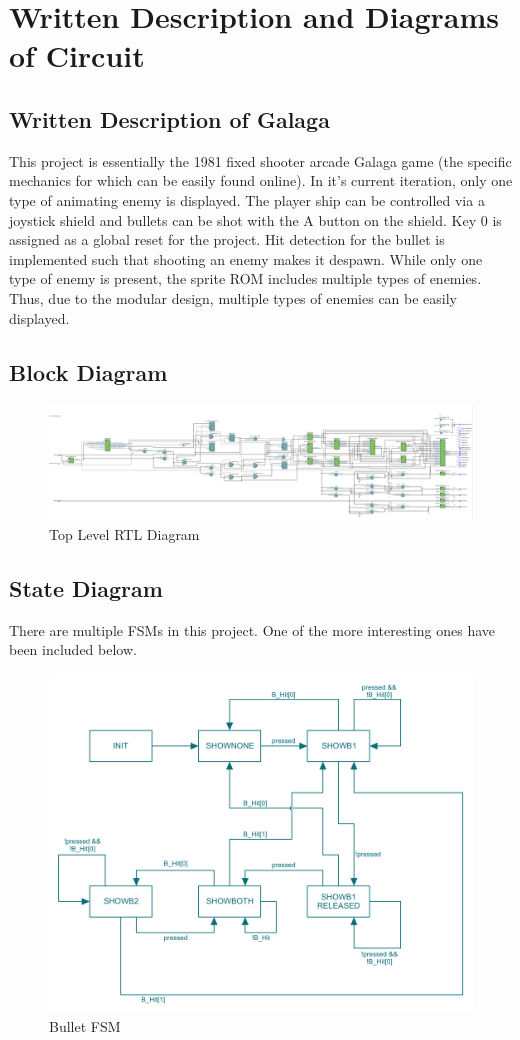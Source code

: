 \section{Written Description and Diagrams of Circuit}
\subsection{Written Description of Galaga}
\quad
This project is essentially the 1981 fixed shooter arcade Galaga game (the specific mechanics for which can be easily found online).
In it's current iteration, only one type of animating enemy is displayed.
The player ship can be controlled via a joystick shield and bullets can be shot with the A button on the shield.
Key 0 is assigned as a global reset for the project.
Hit detection for the bullet is implemented such that shooting an enemy makes it despawn.
While only one type of enemy is present, the sprite ROM includes multiple types of enemies.
Thus, due to the modular design, multiple types of enemies can be easily displayed.

\subsection{Block Diagram}
\begin{figure}[!htb]
  \centering
  \includegraphics[width=\linewidth]{rtl.png}
  \caption{Top Level RTL Diagram}
  \label{Fig: TLRTL}
\end{figure}

\pagebreak


\subsection{State Diagram}
\quad
There are multiple FSMs in this project.
One of the more interesting ones have been included below.

\begin{figure}[!htb]
  \centering
  \includegraphics[width=\linewidth]{bullet_fsm.png}
  \caption{Bullet FSM}
  \label{Fig: BulletFSM}
\end{figure}

